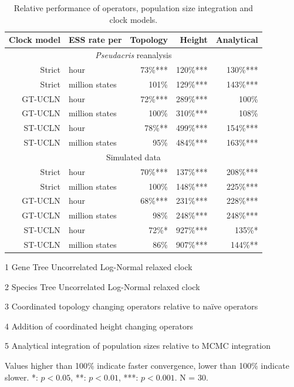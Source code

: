 \documentclass[12pt]{article}
\begin{document}
\begin{table}[htb!]
\caption{Relative performance of operators, population size integration and clock models.}
\label{tab:convergenceLM}
\begin{threeparttable}
\begin{tabular*}{\textwidth}{@{\extracolsep{\fill}}rlrrr@{}}
\hline
Clock model & ESS rate per & Topology\tnote{3} & Height\tnote{4} & Analytical\tnote{5}\tabularnewline
\hline
\multicolumn{5}{c}{\textit{Pseudacris} reanalysis}\tabularnewline
\hline
Strict & hour & 73\%{***} & 120\%{***} & 130\%{***}\tabularnewline
Strict & million states & 101\%\hphantom{***} & 129\%{***} & 143\%{***}\tabularnewline
GT-UCLN\tnote{1} & hour & 72\%{***} & 289\%{***} & 100\%\hphantom{***}\tabularnewline
GT-UCLN & million states & 100\%\hphantom{***} & 310\%{***} & 108\%\hphantom{***}\tabularnewline
ST-UCLN\tnote{2} & hour & 78\%{**}\hphantom{*} & 499\%{***} & 154\%{***}\tabularnewline
ST-UCLN & million states & 95\%\hphantom{***} & 484\%{***} & 163\%{***}\tabularnewline
\hline
\multicolumn{5}{c}{Simulated data}\tabularnewline
\hline
Strict & hour & 70\%{***} & 137\%{***} & 208\%{***}\tabularnewline
Strict & million states & 100\%\hphantom{***} & 148\%{***} & 225\%{***}\tabularnewline
GT-UCLN & hour & 68\%{***} & 231\%{***} & 228\%{***}\tabularnewline
GT-UCLN & million states & 98\%\hphantom{***} & 248\%{***} & 248\%{***}\tabularnewline
ST-UCLN & hour & 72\%{*}\hphantom{**} & 927\%{***} & 135\%{*}\hphantom{**}\tabularnewline
ST-UCLN & million states & 86\%\hphantom{***} & 907\%{***} & 144\%{**}\hphantom{*}\tabularnewline
\hline
\end{tabular*}
\begin{tablenotes}
\item[1] Gene Tree Uncorrelated Log-Normal relaxed clock
\item[2] Species Tree Uncorrelated Log-Normal relaxed clock
\item[3] Coordinated topology changing operators relative to na\"ive operators
\item[4] Addition of coordinated height changing operators
\item[5] Analytical integration of population sizes relative to MCMC integration
\item Values higher than 100\% indicate faster convergence, lower than 100\% indicate slower. {*}: $p < 0.05$, {**}: $p < 0.01$, {***}: $p < 0.001$. N = 30.
\end{tablenotes}
\end{threeparttable}
\end{table}
\end{document}
